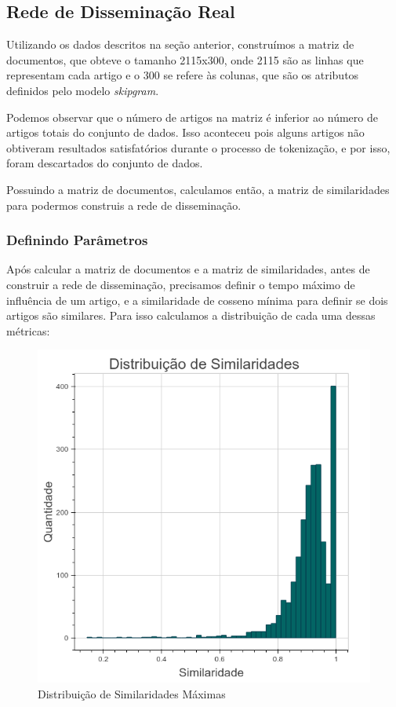 \documentclass[a4paper,12pt]{article}
\begin{document}
\subsection{Rede de Disseminação Real}

Utilizando os dados descritos na seção anterior, construímos a matriz de documentos, que obteve o tamanho 2115x300, onde 2115 são as linhas
que representam cada artigo e o 300 se refere às colunas, que são os atributos definidos pelo modelo \textit{skipgram}.

Podemos observar que o número de artigos na matriz é inferior ao número de artigos totais do conjunto de dados. Isso aconteceu pois 
alguns artigos não obtiveram resultados satisfatórios durante o processo de tokenização, e por isso, foram descartados do conjunto de dados.

Possuindo a matriz de documentos, calculamos então, a matriz de similaridades para podermos construis a rede de disseminação.

\pagebreak
\subsubsection{Definindo Parâmetros}

Após calcular a matriz de documentos e a matriz de similaridades, antes de construir a rede de disseminação,
precisamos definir o tempo máximo de influência de um artigo, e a similaridade de cosseno
mínima para definir se dois artigos são similares. Para isso calculamos a distribuição de cada uma dessas métricas:

\begin{figure}[ht]
 \centering
 \includegraphics[scale=0.4]{./2.png}
 \caption{Distribuição de Similaridades Máximas}
\end{figure}
\end{document}

